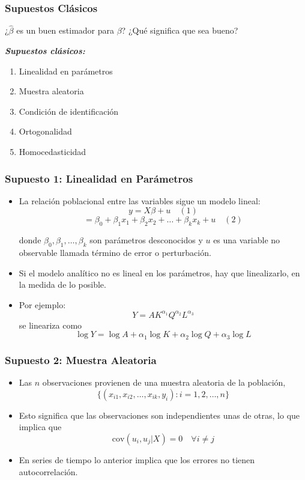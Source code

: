 \documentclass{beamer}
\begin{document}
\begin{frame}
\frametitle{Supuestos Clásicos}
¿$\hat{\beta}$ es un buen estimador para $\beta$? ¿Qué significa que sea bueno?\\
\medskip
{\color{blue}
\textbf{\textit{Supuestos clásicos:}}

\begin{enumerate}
    \item Linealidad en parámetros
    \item Muestra aleatoria
    \item Condición de identificación
    \item Ortogonalidad
    \item Homocedasticidad
\end{enumerate}}
\end{frame}
\begin{frame}
\frametitle{Supuesto 1: Linealidad en Parámetros}
\begin{itemize}
    \item La relación poblacional entre las variables sigue un modelo lineal:
    \[
    y = X \beta + u \quad (1)
    \]
        \[ = \beta_0 + \beta_1 x_1 + \beta_2 x_2 + \ldots + \beta_k x_k + u \quad (2)
    \]
    
    donde $\beta_0, \beta_1, \ldots, \beta_k$ son parámetros desconocidos y $u$ es una variable no observable llamada término de error o perturbación.
    \item Si el modelo analítico no es lineal en los parámetros, hay que linealizarlo, en la medida de lo posible.
    \item Por ejemplo:
    \[
    Y = A K^{\alpha_1} Q^{\alpha_2} L^{\alpha_3}
    \]
    se lineariza como
    \[
    \log Y = \log A + \alpha_1 \log K + \alpha_2 \log Q + \alpha_3 \log L
    \]
\end{itemize}
\end{frame}
\begin{frame}
\frametitle{Supuesto 2: Muestra Aleatoria}
\begin{itemize}
    \item Las $n$ observaciones provienen de una muestra aleatoria de la población,
    \[
    \{(x_{i1}, x_{i2}, \ldots, x_{ik}, y_i) : i = 1, 2, \ldots, n\}
    \]
    \item Esto significa que las observaciones son independientes unas de otras, lo que implica que
    \[
    \text{cov}(u_i, u_j|X) = 0 \quad \forall i \neq j
    \]
    \item En series de tiempo lo anterior implica que los errores no tienen autocorrelación.
\end{itemize}
\end{frame}
\end{document}
